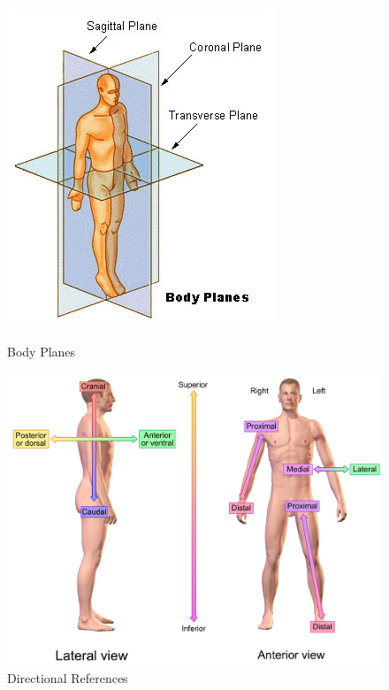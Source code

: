 \begin{figure}[htb]
	\centering
	\begin{minipage}[t]{0.38\linewidth}
		\centering
		\includegraphics[width=1\linewidth]{Pictures/bodyPlanes}
		\caption{Body Planes \cite{Wiki2017-ATOL}}
		\label{fig:bodyPlanes}
	\end{minipage}
	\hfill
	\begin{minipage}[t]{0.6\linewidth}
		\centering
		\includegraphics[width=1\linewidth]{Pictures/bodyDirectionalReferences}
		\caption{Directional References \cite{Wiki2017-ATOL}}
		\label{fig:bodyDirectionalReferences}
	\end{minipage}
\end{figure}


